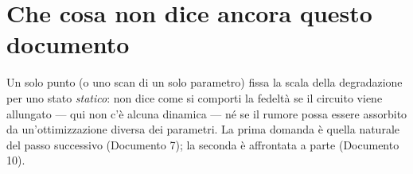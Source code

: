 \documentclass[11pt,a4paper]{article}
\begin{document}
\FloatBarrier

\section{Che cosa non dice ancora questo documento}

Un solo punto (o uno scan di un solo parametro) fissa la scala della
degradazione per uno stato \emph{statico}: non dice come si comporti la
fedeltà se il circuito viene allungato --- qui non c'è alcuna dinamica --- né
se il rumore possa essere assorbito da un'ottimizzazione diversa dei
parametri. La prima domanda è quella naturale del passo successivo
(Documento 7); la seconda è affrontata a parte (Documento 10).

\end{document}
